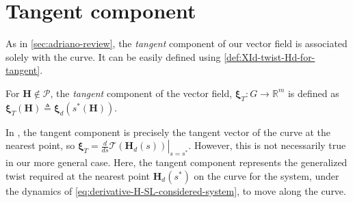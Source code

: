 \section{Tangent component}
As in \cref{sec:adriano-review}, the \emph{tangent} component of our vector field is associated solely with the curve. It can be easily defined using \cref{def:XId-twist-Hd-for-tangent}.
\begin{definition} \label{def:tangent-vector}
     For $\mathbf{H} \not \in \mathcal{P}$, the \emph{tangent} component of the vector field, $\boldsymbol{\xi}_T:G\to\mathbb{R}^m$ is defined as $\boldsymbol{\xi}_T(\mathbf{H})\triangleq\boldsymbol{\xi}_d(s^*(\mathbf{H}))$. 
\end{definition}

\begin{example}
    In \citet{Rezende2022}, the tangent component is precisely the tangent vector of the curve at the nearest point, so $\boldsymbol{\xi}_{T}=\left.\frac{d}{ds}\mathcal{T}(\mathbf{H}_d(s))\right|_{s=s^*}$. However, this is not necessarily true in our more general case. Here, the tangent component represents the generalized twist required at the nearest point $\mathbf{H}_d(s^*)$ on the curve for the system, under the dynamics of \eqref{eq:derivative-H-SL-considered-system}, to move along the curve.
\end{example}
